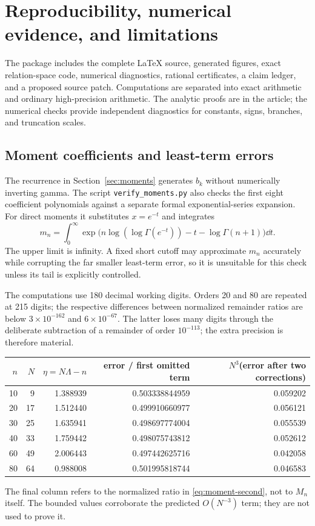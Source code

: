 \section{Reproducibility, numerical evidence, and limitations}
\label{sec:verification}

The package includes the complete LaTeX source, generated figures, exact
relation-space code, numerical diagnostics, rational certificates, a
claim ledger, and a proposed source patch. Computations are separated
into exact arithmetic and ordinary high-precision arithmetic. The
analytic proofs are in the article; the numerical checks provide
independent diagnostics for constants, signs, branches, and truncation
scales.

\subsection{Moment coefficients and least-term errors}

The recurrence in Section~\ref{sec:moments} generates \(b_k\)
without numerically inverting gamma. The script
\texttt{verify\_moments.py} also checks the first eight coefficient
polynomials against a separate formal exponential-series expansion.
For direct moments it substitutes \(x=e^{-t}\) and integrates
\[
 m_n=\int_0^\infty
  \exp\bigl(n\log(\log\Gamma(e^{-t}))-t-\log\Gamma(n+1)\bigr)\dd t.
\]
The upper limit is infinity. A fixed short cutoff may approximate
\(m_n\) accurately while corrupting the far smaller least-term error,
so it is unsuitable for this check unless its tail is explicitly
controlled.

The computations use 180 decimal working digits. Orders 20 and 80
are repeated at 215 digits; the respective differences between
normalized remainder ratios are below \(3\times10^{-162}\) and
\(6\times10^{-67}\). The latter loses many digits through the
deliberate subtraction of a remainder of order \(10^{-113}\);
the extra precision is therefore material.

\begin{center}
\small
\begin{tabular}{rrrrr}
\toprule
\(n\)&\(N\)&\(\eta=N\Lambda-n\)&
error / first omitted term&
\(N^3\)(error after two corrections)\\
\midrule
10&9 &1.388939&0.503338844959&0.059202\\
20&17&1.512440&0.499910660977&0.056121\\
30&25&1.635941&0.498697774004&0.055539\\
40&33&1.759442&0.498075743812&0.052612\\
60&49&2.006443&0.497442625716&0.042058\\
80&64&0.988008&0.501995818744&0.046583\\
\bottomrule
\end{tabular}
\end{center}
The final column refers to the normalized ratio in
\eqref{eq:moment-second}, not to \(M_n\) itself.
The bounded values corroborate the predicted \(O(N^{-3})\) term;
they are not used to prove it.

